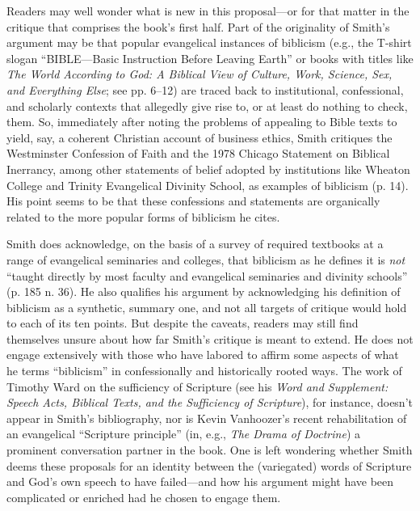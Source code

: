 Readers may well wonder what is new in this proposal—or for that matter
in the critique that comprises the book’s first half. Part of the
originality of Smith’s argument may be that popular evangelical
instances of biblicism (e.g., the T-shirt slogan “BIBLE—Basic
Instruction Before Leaving Earth” or books with titles like \emph{The World
According to God: A Biblical View of Culture, Work, Science, Sex, and
Everything Else}; see pp. 6--12) are traced back to institutional,
confessional, and scholarly contexts that allegedly give rise to, or at
least do nothing to check, them. So, immediately after noting the
problems of appealing to Bible texts to yield, say, a coherent Christian
account of business ethics, Smith critiques the Westminster Confession
of Faith and the 1978 Chicago Statement on Biblical Inerrancy, among
other statements of belief adopted by institutions like Wheaton College
and Trinity Evangelical Divinity School, as examples of biblicism (p.
14). His point seems to be that these confessions and statements are
organically related to the more popular forms of biblicism he cites.

Smith does acknowledge, on the basis of a survey of required textbooks
at a range of evangelical seminaries and colleges, that biblicism as he
defines it is \emph{not} “taught directly by most faculty and evangelical
seminaries and divinity schools” (p. 185 n. 36). He also qualifies his
argument by acknowledging his definition of biblicism as a synthetic,
summary one, and not all targets of critique would hold to each of its
ten points. But despite the caveats, readers may still find themselves
unsure about how far Smith’s critique is meant to extend. He does not
engage extensively with those who have labored to affirm some aspects of
what he terms “biblicism” in confessionally and historically rooted
ways. The work of Timothy Ward on the sufficiency of Scripture (see his
\emph{Word and Supplement: Speech Acts, Biblical Texts, and the Sufficiency
of Scripture}), for instance, doesn’t appear in Smith’s bibliography,
nor is Kevin Vanhoozer’s recent rehabilitation of an evangelical
“Scripture principle” (in, e.g., \emph{The Drama of Doctrine}) a prominent
conversation partner in the book. One is left wondering whether Smith
deems these proposals for an identity between the (variegated) words of
Scripture and God’s own speech to have failed—and how his argument might
have been complicated or enriched had he chosen to engage them.

